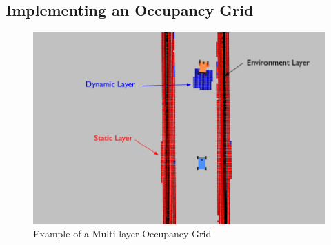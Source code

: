 \documentclass[letter]{article}
\begin{document}
\subsection{Implementing an Occupancy Grid}
\begin{figure}[!hb]
    \begin{center}
    \includegraphics[scale=0.35]{grid_map_annotated.png}
    \end{center}
    \caption{Example of a Multi-layer Occupancy Grid}
    \label{fig:occgrid}
\end{figure}
\end{document}
